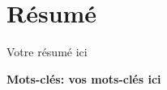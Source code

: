 \chapter*{Résumé}
\normalsize{
Votre résumé ici
}

\medskip
{\noindent \textbf{Mots-clés: vos mots-clés ici} }
